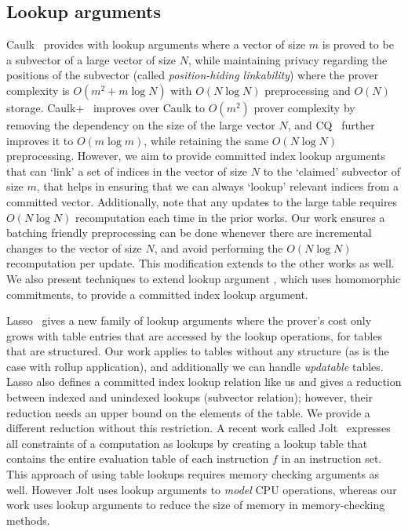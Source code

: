 \subsection{Lookup arguments}

Caulk~\cite{CCS:ZBKMNS22} provides with lookup arguments where a vector of size $m$ is proved to be a subvector of a large vector of size $N$, while maintaining privacy regarding the positions of the subvector (called \emph{position-hiding linkability}) where the prover complexity is $O(m^2+m\log N)$ with $O(N\log N)$ preprocessing and $O(N)$ storage. Caulk+~\cite{EPRINT:PosKat22} improves over Caulk to $O(m^2)$ prover complexity by removing the dependency on the size of the large vector $N$, and CQ~\cite{EPRINT:EagFioGab22} further improves it to $O(m\log m)$, while retaining the same $O(N\log N)$ preprocessing. 
However, we aim to provide committed index lookup arguments that can `link' a set of indices in the vector of size $N$ to the `claimed' subvector of size $m$, that helps in ensuring that we can always `lookup' relevant indices from a committed vector. Additionally, note that any updates to the large table requires $O(N\log N)$ recomputation each time in the prior works. Our work ensures a batching friendly preprocessing can be done whenever there are incremental changes to the vector of size $N$, and avoid performing the $O(N\log N)$ recomputation per update. This modification extends to the other works as well. We also present techniques to extend lookup argument \cite{EPRINT:EagFioGab22}, which uses homomorphic commitments, to provide a committed index lookup argument.

Lasso~\cite{lasso} gives a new family of lookup arguments where the prover's cost only grows with table entries that are
accessed by the lookup operations, for tables that are structured. Our work applies to tables without any structure (as is the case with rollup application), and additionally we can handle \emph{updatable} tables.
Lasso also defines a committed index lookup relation like us and gives a reduction between indexed and unindexed lookups (subvector relation); however, their reduction needs an upper bound on the elements of the table. We provide a different reduction without this restriction. 
A recent work called Jolt~\cite{jolt} expresses all constraints of a computation as lookups by creating a lookup table that contains the entire evaluation table of each instruction $f$ in an instruction set.
This approach of using table lookups requires memory checking arguments as well. However Jolt uses lookup arguments to \emph{model} CPU operations, whereas our work uses lookup arguments to reduce the size of memory in memory-checking methods. 



